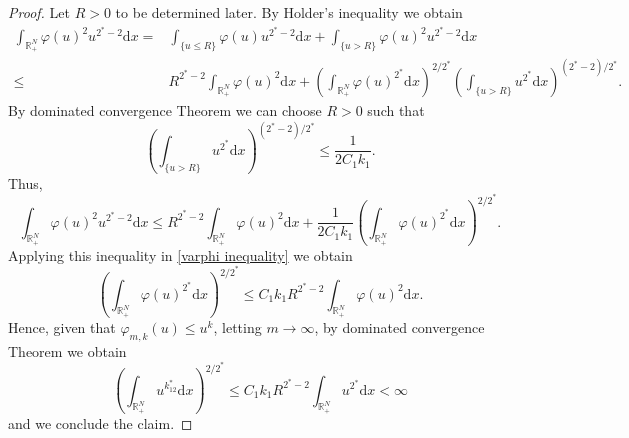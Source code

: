 \documentclass[10pt,a4paper]{amsart}
\begin{document}
\begin{proof}
Let $R>0$ to be determined later. By Holder's inequality we obtain
\begin{align*}
    \int_{\mathds{R}^N_+}\varphi(u)^2u^{2^\ast-2}\mathrm{d}x=&\int_{\{u\leq R\}}\varphi(u)u^{2^\ast-2}\mathrm{d}x+\int_{\{u>R\}}\varphi(u)^2u^{2^\ast-2}\mathrm{d}x\\
    \leq& R^{2^\ast-2}\int_{\mathds{R}^N_+}\varphi(u)^2\mathrm{d}x+\left(\int_{\mathds{R}^N_+}\varphi(u)^{2^\ast}\mathrm{d}x\right)^{2/2^\ast}\left(\int_{\{u>R\}}u^{2^\ast}\mathrm{d}x\right)^{(2^\ast-2)/2^\ast}.
\end{align*}
By dominated convergence Theorem we can choose $R>0$ such that 
\begin{equation*}
    \left(\int_{\{u>R\}}u^{2^\ast}\mathrm{d}x\right)^{(2^\ast-2)/2^\ast} \leq \frac{1}{2C_1k_1}.
\end{equation*}
Thus,
\begin{equation*}
    \int_{\mathds{R}^N_+}\varphi(u)^2u^{2^\ast-2}\mathrm{d}x\leq R^{2^\ast-2}\int_{\mathds{R}^N_+}\varphi(u)^2\mathrm{d}x+\frac{1}{2C_1k_1}\left(\int_{\mathds{R}^N_+}\varphi(u)^{2^\ast}\mathrm{d}x\right)^{2/2^\ast}.
\end{equation*}
Applying this inequality in \eqref{varphi inequality} we obtain
\begin{equation*}
    \left(\int_{\mathds{R}^N_+}\varphi(u)^{2^\ast}\mathrm{d}x\right)^{2/2^\ast}\leq C_1k_1 R^{2^\ast-2}\int_{\mathds{R}^N_+}\varphi(u)^2\mathrm{d}x.
\end{equation*}
Hence, given that $\varphi_{m,k}(u)\leq u^{k}$, letting $m\longrightarrow\infty$, by dominated convergence Theorem we obtain
\begin{equation*}
     \left(\int_{\mathds{R}^N_+}u^{k_12^\ast}\mathrm{d}x\right)^{2/2^\ast} \leq C_1k_1R^{2^\ast-2}\int_{\mathds{R}^N_+}u^{2^\ast}\mathrm{d}x<\infty
\end{equation*}
and we conclude the claim.


\end{proof}
\end{document}
